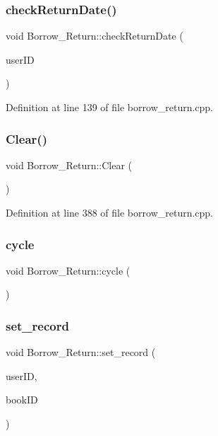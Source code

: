 \subsubsection{\texorpdfstring{checkReturnDate()}{checkReturnDate()}}
{\footnotesize\ttfamily void Borrow\+\_\+\+Return\+::check\+Return\+Date (\begin{DoxyParamCaption}\item[{Q\+String}]{user\+ID }\end{DoxyParamCaption})}



Definition at line 139 of file borrow\+\_\+return.\+cpp.

\mbox{\label{class_borrow___return_a65b8b7b7c224f0747c4330fb9aa6fdce}} 
\subsubsection{\texorpdfstring{Clear()}{Clear()}}
{\footnotesize\ttfamily void Borrow\+\_\+\+Return\+::\+Clear (\begin{DoxyParamCaption}{ }\end{DoxyParamCaption})}



Definition at line 388 of file borrow\+\_\+return.\+cpp.

\mbox{\label{class_borrow___return_a52dd74c4080e36657cf122c7c8569a89}} 
\subsubsection{\texorpdfstring{cycle}{cycle}}
{\footnotesize\ttfamily void Borrow\+\_\+\+Return\+::cycle (\begin{DoxyParamCaption}{ }\end{DoxyParamCaption})\hspace{0.3cm}{\ttfamily [signal]}}

\mbox{\label{class_borrow___return_a8e6d3fb8c8fcab43ff158d5a0a1d7f40}} 
\subsubsection{\texorpdfstring{set\_record}{set\_record}}
{\footnotesize\ttfamily void Borrow\+\_\+\+Return\+::set\+\_\+record (\begin{DoxyParamCaption}\item[{Q\+String}]{user\+ID,  }\item[{Q\+String}]{book\+ID }\end{DoxyParamCaption})\hspace{0.3cm}{\ttfamily [signal]}}

